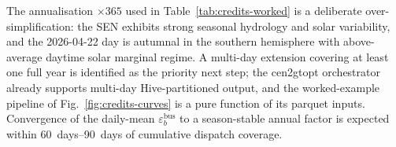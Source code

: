 The annualisation $\times 365$ used in
Table~\ref{tab:credits-worked} is a deliberate over-simplification:
the SEN exhibits strong seasonal hydrology and solar variability,
and the 2026-04-22 day is autumnal in the southern hemisphere with
above-average daytime solar marginal regime.  A multi-day
extension covering at least one full year is identified as the
priority next step; the cen2gtopt orchestrator already supports
multi-day Hive-partitioned output, and the worked-example pipeline
of Fig.~\ref{fig:credits-curves} is a pure function of its parquet
inputs.  Convergence of the daily-mean $\varepsilon^{\mathrm{bus}}_b$
to a season-stable annual factor is expected within
\SIrange{60}{90}{days} of cumulative dispatch coverage.
